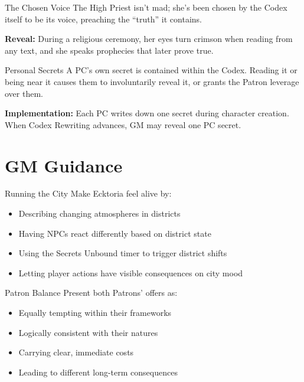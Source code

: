 \documentclass[11pt]{article}
\begin{document}
\begin{mechanicsbox}{The Chosen Voice}
The High Priest isn't mad; she's been chosen by the Codex itself to be its voice, preaching the ``truth'' it contains.

\textbf{Reveal:} During a religious ceremony, her eyes turn crimson when reading from any text, and she speaks prophecies that later prove true.
\end{mechanicsbox}

\begin{mechanicsbox}{Personal Secrets}
A PC's own secret is contained within the Codex. Reading it or being near it causes them to involuntarily reveal it, or grants the Patron leverage over them.

\textbf{Implementation:} Each PC writes down one secret during character creation. When Codex Rewriting advances, GM may reveal one PC secret.
\end{mechanicsbox}

\section*{GM Guidance}

\begin{mechanicsbox}{Running the City}
Make Ecktoria feel alive by:
\begin{itemize}
    \item Describing changing atmospheres in districts
    \item Having NPCs react differently based on district state
    \item Using the Secrets Unbound timer to trigger district shifts
    \item Letting player actions have visible consequences on city mood
\end{itemize}
\end{mechanicsbox}

\begin{mechanicsbox}{Patron Balance}
Present both Patrons' offers as:
\begin{itemize}
    \item Equally tempting within their frameworks
    \item Logically consistent with their natures
    \item Carrying clear, immediate costs
    \item Leading to different long-term consequences
\end{itemize}
\end{mechanicsbox}
\end{document}
